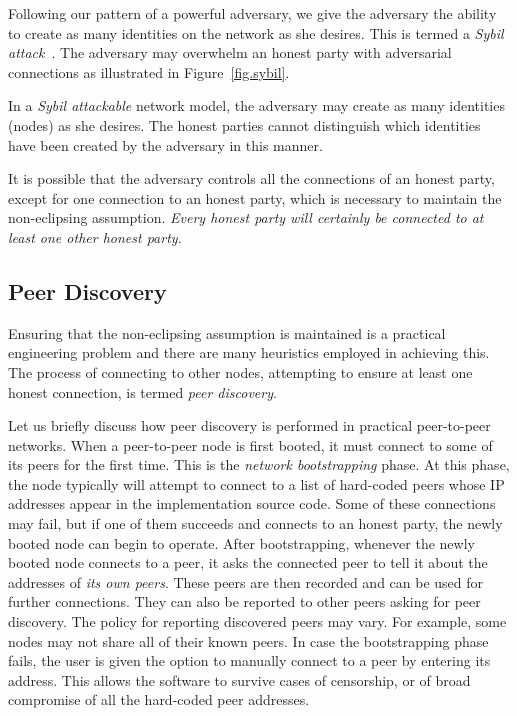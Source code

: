Following our pattern of a powerful adversary, we give the adversary the ability to create
as many identities on the network as she desires. This is termed a
\emph{Sybil attack}~\cite{sybil}. The adversary may overwhelm an honest party with adversarial
connections as illustrated in Figure~\ref{fig.sybil}.

\begin{definition}
  In a \emph{Sybil attackable} network model, the adversary may create as many identities (nodes)
  as she desires. The honest parties cannot distinguish which identities have been created by
  the adversary in this manner.
\end{definition}

It is possible that the adversary controls all the connections of an honest party, except for
one connection to an honest party, which is necessary to maintain the non-eclipsing assumption.
\emph{Every honest party will certainly be connected to at least one other honest party.}

\subsection*{Peer Discovery}

Ensuring that the non-eclipsing assumption is maintained is a practical engineering problem and
there are many heuristics employed in achieving this. The process of connecting to other nodes,
attempting to ensure at least one honest connection, is termed \emph{peer discovery}.

Let us briefly discuss how peer discovery is performed in practical peer-to-peer
networks. When a peer-to-peer node is first booted, it must connect to some of its peers for the
first time. This is the \emph{network bootstrapping} phase. At this phase, the node typically
will attempt to connect to a list of hard-coded peers whose IP addresses appear in the implementation
source code. Some of these connections may fail, but if one of them succeeds and connects to an honest
party, the newly booted node can begin to operate. After bootstrapping, whenever the newly booted node connects
to a peer, it asks the connected peer to tell it about the addresses of \emph{its own peers}. These
peers are then recorded and can be used for further connections. They can also be reported to other
peers asking for peer discovery. The policy for reporting discovered peers may vary. For example,
some nodes may not share all of their known peers. In case the bootstrapping phase fails, the user
is given the option to manually connect to a peer by entering its address. This allows the software
to survive cases of censorship, or of broad compromise of all the hard-coded peer addresses.

